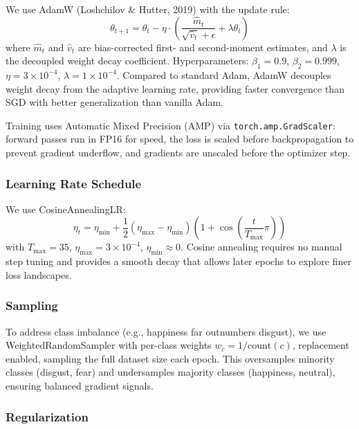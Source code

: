 \documentclass[12pt,a4paper]{article}
\begin{document}
We use AdamW (Loshchilov \& Hutter, 2019) with the update rule:
\begin{equation}
\theta_{t+1} = \theta_t - \eta \cdot \left(\frac{\hat{m}_t}{\sqrt{\hat{v}_t} + \epsilon} + \lambda \theta_t\right)
\end{equation}
where $\hat{m}_t$ and $\hat{v}_t$ are bias-corrected first- and second-moment estimates, and $\lambda$ is the decoupled weight decay coefficient. Hyperparameters: $\beta_1=0.9$, $\beta_2=0.999$, $\eta=3\times10^{-4}$, $\lambda=1\times10^{-4}$. Compared to standard Adam, AdamW decouples weight decay from the adaptive learning rate, providing faster convergence than SGD with better generalization than vanilla Adam.

Training uses Automatic Mixed Precision (AMP) via \texttt{torch.amp.GradScaler}: forward passes run in FP16 for speed, the loss is scaled before backpropagation to prevent gradient underflow, and gradients are unscaled before the optimizer step.

\subsubsection{Learning Rate Schedule}

We use CosineAnnealingLR:
\begin{equation}
\eta_t = \eta_{\min} + \frac{1}{2}(\eta_{\max} - \eta_{\min})\left(1 + \cos\left(\frac{t}{T_{\max}}\pi\right)\right)
\end{equation}
with $T_{\max}=35$, $\eta_{\max}=3\times10^{-4}$, $\eta_{\min}\approx 0$. Cosine annealing requires no manual step tuning and provides a smooth decay that allows later epochs to explore finer loss landscapes.

\subsubsection{Sampling}

To address class imbalance (e.g., happiness far outnumbers disgust), we use WeightedRandomSampler with per-class weights $w_c = 1 / \text{count}(c)$, replacement enabled, sampling the full dataset size each epoch. This oversamples minority classes (disgust, fear) and undersamples majority classes (happiness, neutral), ensuring balanced gradient signals.

\subsubsection{Regularization}
\end{document}
